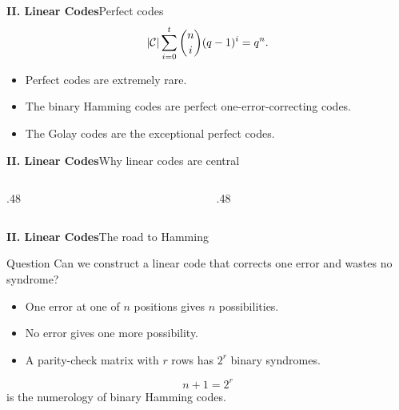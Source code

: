 \begin{frame}{\textbf{II. Linear Codes}}{Perfect codes}
\small
{}
\[
  |\mathcal{C}|\sum_{i=0}^t \binom{n}{i}(q-1)^i=q^n.
\]
\begin{itemize}
  \item Perfect codes are extremely rare.
  \item The binary Hamming codes are perfect one-error-correcting codes.
  \item The Golay codes are the exceptional perfect codes.
\end{itemize}
\end{frame}

\begin{frame}{\textbf{II. Linear Codes}}{Why linear codes are central}
\small
\begin{columns}[T,onlytextwidth]
  \begin{column}{.48\textwidth}
  \end{column}
  \begin{column}{.48\textwidth}
  \end{column}
\end{columns}
\end{frame}

\begin{frame}{\textbf{II. Linear Codes}}{The road to Hamming}
\small
\begin{block}{Question}
Can we construct a linear code that corrects one error and wastes no syndrome?
\end{block}
\begin{itemize}
  \item One error at one of $n$ positions gives $n$ possibilities.
  \item No error gives one more possibility.
  \item A parity-check matrix with $r$ rows has $2^r$ binary syndromes.
\end{itemize}
\[
  n+1=2^r
\]
is the numerology of binary Hamming codes.
\end{frame}
